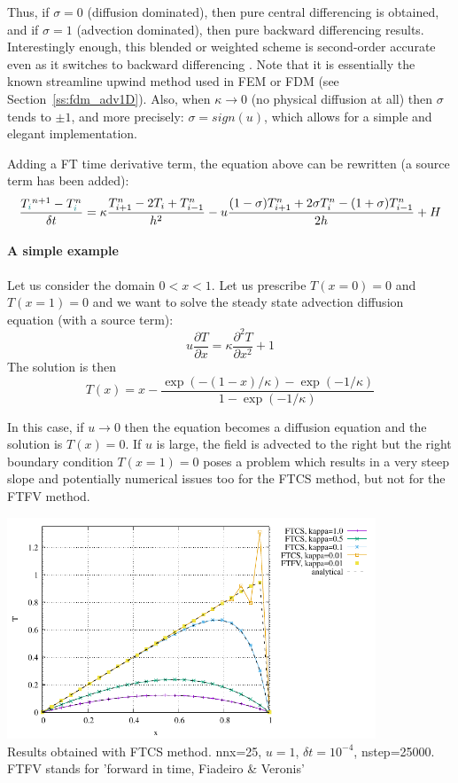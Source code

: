 Thus, if $\sigma = 0$ (diffusion dominated), then pure central differencing is obtained, and if
$\sigma = 1$ (advection dominated), then pure backward differencing results. Interestingly
enough, this blended or weighted scheme is second-order accurate even as it switches
to backward differencing \cite{five77}. 
Note that it is essentially the known streamline upwind method used in FEM or FDM (see
Section~\ref{ss:fdm_adv1D}). 
Also, when $\kappa \rightarrow 0$ (no physical diffusion at all)
then $\sigma$ tends to $\pm 1$, and more precisely: $\sigma = sign(u)$, which allows for a simple 
and elegant implementation. 

Adding a FT time derivative term, the equation above can be rewritten (a source
term has been added):
\[
\frac{T_{\color{teal}i}^{n+1}-T^n_{\color{teal}i}}{\delta t} 
=
\kappa \frac{T_{i+1}^n-2T_i + T_{i-1}^n}{h^2}
- u \frac{(1-\sigma) T_{i+1}^n+2\sigma T_i^n -(1+\sigma)T_{i-1}^n}{2 h} +H 
\]



\paragraph{A simple example} Let us consider the domain $0<x<1$.
Let us prescribe $T(x=0)=0$  and $T(x=1)=0$ and we want to solve 
the steady state advection diffusion equation (with a source term):
\begin{equation}
u \frac{\partial T}{\partial x} = \kappa \frac{\partial^2 T}{\partial x^2} + 1
\label{eq:fdmadvdiff2}
\end{equation}
The solution is then 
\begin{equation}
T(x)=x - \frac{\exp (-(1-x)/\kappa) -\exp (-1/\kappa)  }{1-\exp (-1/\kappa)}
\label{eq:fdmadvdiff1}
\end{equation}

In this case, if $u\rightarrow 0$ then the equation becomes a diffusion equation
and the solution is $T(x)=0$. If $u$ is large, the field is advected to the right
but the right boundary condition $T(x=1)=0$ poses a problem which results in a very steep slope
and potentially numerical issues too for the FTCS method, but not for the FTFV method.

\begin{center}
\includegraphics[width=11cm]{images/fdm/adv_diff/T.pdf}\\
{\captionfont Results obtained with FTCS method. nnx=25, $u=1$, $\delta t=10^{-4}$, 
nstep=25000. FTFV stands for 'forward in time, Fiadeiro \& Veronis'}
\end{center}

